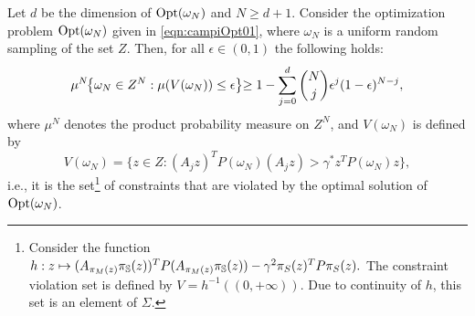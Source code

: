 \begin{theorem}\label{mainTheorem0}
Let $d$ be the dimension of $\text{Opt}(\omega_N)$ and $N \geq d+1$. Consider the optimization problem $\text{Opt}(\omega_N)$ given in \eqref{eqn:campiOpt01}, where $\omega_N$ is a uniform random sampling of the set $Z$.
Then, for all $\epsilon \in (0,1)$ the following holds:
\begin{equation}\label{eqn:violation}\mu^N\hspace{-1mm}\left\{ \omega_N \in Z^N: \mu(V(\omega_N)) \leq \epsilon \right\}\hspace{-1mm} \geq 1- \sum_{j=0}^{d} \binom{N}{j}\epsilon^j (1-\epsilon)^{N-j},\end{equation}
where $\mu^N$ denotes the product probability measure on $Z^N$, and $V(\omega_N)$ is defined by $$V(\omega_N) = \{z \in Z: (A_j z)^TP(\omega_N)(A_j z) > \gamma^*z^TP(\omega_N)z\},$$
i.e., it is the set\footnote{Consider the function $h: z \mapsto (A_{\pi_M(z)} \pi_{\mathbb{S}}(z))^T P (A_{\pi_M(z)} \pi_{\mathbb{S}}(z) ) - \gamma^2 \pi_S(z) ^T P \pi_S(z).$ The constraint violation set is defined by \mbox{$V= h^{-1}( (0,+\infty) )$}. Due to continuity of $h$, this set  is an element of $\Sigma$.} of constraints that are violated by the optimal solution of $\text{Opt}(\omega_N)$.
\end{theorem}



